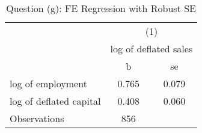 \begin{table}[htbp]\centering
\def\sym#1{\ifmmode^{#1}\else\(^{#1}\)\fi}
\caption{Question (g): FE Regression with Robust SE}
\begin{tabular}{l*{1}{cc}}
\toprule
                    &\multicolumn{2}{c}{(1)}  \\
                    &\multicolumn{2}{c}{log of deflated sales}\\
                    &           b&          se\\
\midrule
log of employment   &       0.765&       0.079\\
log of deflated capital&       0.408&       0.060\\
\midrule
Observations        &         856&            \\
\bottomrule
\end{tabular}
\end{table}
